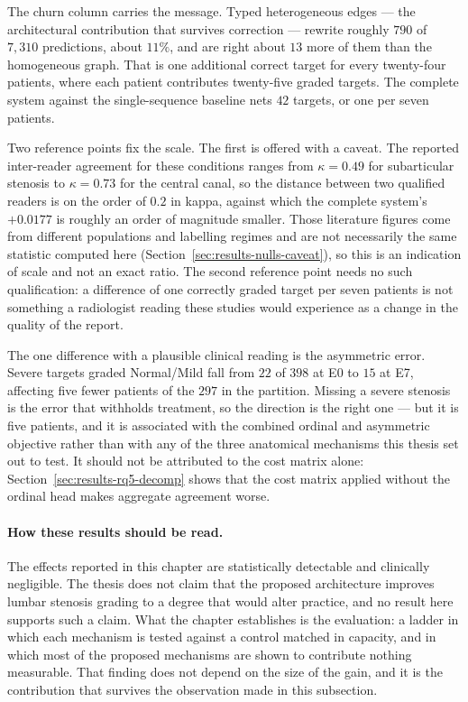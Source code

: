 \documentclass[12pt,a4paper]{report}
\begin{document}
The churn column carries the message. Typed heterogeneous edges --- the
architectural contribution that survives correction --- rewrite roughly $790$ of
$7{,}310$ predictions, about $11\%$, and are right about $13$ more of them than
the homogeneous graph. That is one additional correct target for every
twenty-four patients, where each patient contributes twenty-five graded targets.
The complete system against the single-sequence baseline nets $42$ targets, or
one per seven patients.

Two reference points fix the scale. The first is offered with a caveat. The
reported inter-reader agreement for these conditions ranges from $\kappa = 0.49$
for subarticular stenosis to $\kappa = 0.73$ for the central canal, so the
distance between two qualified readers is on the order of $0.2$ in kappa,
against which the complete system's $+0.0177$ is roughly an order of magnitude
smaller. Those literature figures come from different populations and labelling
regimes and are not necessarily the same statistic computed here
(Section~\ref{sec:results-nulls-caveat}), so this is an indication of scale and
not an exact ratio. The second reference point needs no such qualification: a
difference of one correctly graded target per seven patients is not something a
radiologist reading these studies would experience as a change in the quality of
the report.

The one difference with a plausible clinical reading is the asymmetric error.
Severe targets graded Normal/Mild fall from $22$ of $398$ at E0 to $15$ at E7,
affecting five fewer patients of the $297$ in the partition. Missing a severe
stenosis is the error that withholds treatment, so the direction is the right
one --- but it is five patients, and it is associated with the combined ordinal
and asymmetric objective rather than with any of the three anatomical mechanisms
this thesis set out to test. It should not be attributed to the cost matrix
alone: Section~\ref{sec:results-rq5-decomp} shows that the cost matrix applied
without the ordinal head makes aggregate agreement worse.

\paragraph{How these results should be read.} The effects reported in this
chapter are statistically detectable and clinically negligible. The thesis does
not claim that the proposed architecture improves lumbar stenosis grading to a
degree that would alter practice, and no result here supports such a claim. What
the chapter establishes is the evaluation: a ladder in which each mechanism is
tested against a control matched in capacity, and in which most of the proposed
mechanisms are shown to contribute nothing measurable. That finding does not
depend on the size of the gain, and it is the contribution that survives the
observation made in this subsection.
\end{document}

